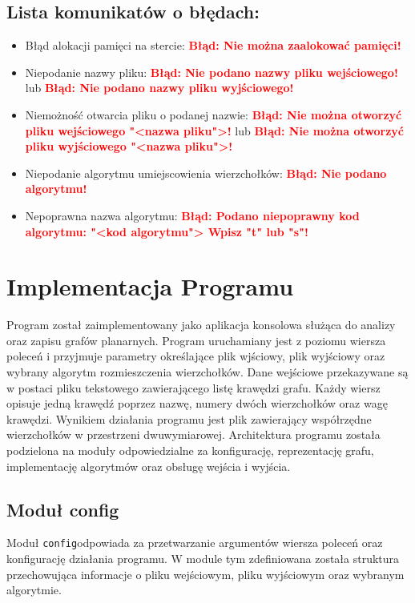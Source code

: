 \documentclass[11pt,a4paper]{article}
\begin{document}
\subsection*{Lista komunikatów o błędach:}
\begin{itemize}
\item Błąd alokacji pamięci na stercie: \textbf{\textcolor{red}{Błąd: Nie można zaalokować pamięci!}}
\item Niepodanie nazwy pliku: \textbf{\textcolor{red}{Błąd: Nie podano nazwy pliku wejściowego!}} lub \textbf{\textcolor{red}{Błąd: Nie podano nazwy pliku wyjściowego!}}
\item Niemożność otwarcia pliku o podanej nazwie: \textbf{\textcolor{red}{Błąd: Nie można otworzyć pliku wejściowego "<nazwa pliku">!}} lub \textbf{\textcolor{red}{Błąd: Nie można otworzyć pliku wyjściowego "<nazwa pliku">!}}
\item Niepodanie algorytmu umiejscowienia wierzchołków: \textbf{\textcolor{red}{Błąd: Nie podano algorytmu!}}
\item Nepoprawna nazwa algorytmu: \textbf{\textcolor{red}{Błąd: Podano niepoprawny kod algorytmu: "<kod algorytmu"> Wpisz "t" lub "s"!}}
\end{itemize}

\section{Implementacja Programu}

Program został zaimplementowany jako aplikacja konsolowa służąca do analizy oraz zapisu grafów planarnych. Program uruchamiany jest z poziomu wiersza poleceń i przyjmuje parametry określające plik wjściowy, plik wyjściowy oraz wybrany algorytm rozmieszczenia wierzchołków.
Dane wejściowe przekazywane są w postaci pliku tekstowego zawierającego listę krawędzi grafu. Każdy wiersz opisuje jedną krawędź poprzez nazwę, numery dwóch wierzchołków oraz wagę krawędzi. Wynikiem działania programu jest plik zawierający współrzędne wierzchołków w przestrzeni dwuwymiarowej.
Architektura programu została podzielona na moduły odpowiedzialne za konfigurację, reprezentację grafu, implementację algorytmów oraz obsługę wejścia i wyjścia.

\subsection{Moduł config}

Moduł \verb|config|odpowiada za przetwarzanie argumentów wiersza poleceń oraz konfigurację działania programu. W module tym zdefiniowana została struktura przechowująca informacje o pliku wejściowym, pliku wyjściowym oraz wybranym algorytmie.
\end{document}
